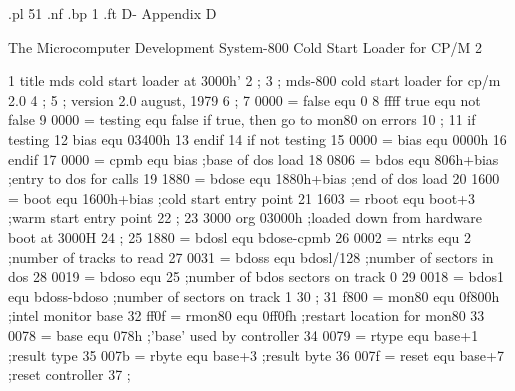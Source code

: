 .pl 51
.nf
.bp 1
.ft                                                       D-%
                                             Appendix D

                              The Microcomputer Development System-800 Cold Start Loader for CP/M 2



  1                                title   mds cold start loader at 3000h'
  2                       ;
  3                       ;        mds-800 cold start loader for cp/m 2.0
  4                       ;
  5                       ;        version 2.0 august, 1979
  6                       ;
  7      0000 =           false    equ     0
  8      ffff             true     equ     not false
  9      0000 =           testing  equ     false    if true, then go to mon80 on errors
 10                       ;
 11                                if      testing
 12                       bias     equ     03400h
 13                                endif
 14                                if      not testing
 15      0000 =           bias     equ     0000h
 16                                endif
 17      0000 =           cpmb     equ     bias          ;base of dos load
 18      0806 =           bdos     equ     806h+bias     ;entry to dos for calls
 19      1880 =           bdose    equ     1880h+bias    ;end of dos load
 20      1600 =           boot     equ     1600h+bias    ;cold start entry point
 21      1603 =           rboot    equ     boot+3        ;warm start entry point
 22                       ;
 23      3000                      org     03000h        ;loaded down from hardware boot at 3000H
 24                       ;
 25      1880 =           bdosl    equ     bdose-cpmb
 26      0002 =           ntrks    equ     2             ;number of tracks to read
 27      0031 =           bdoss    equ     bdosl/128     ;number of sectors in dos
 28      0019 =           bdoso    equ     25            ;number of bdos sectors on track 0
 29      0018 =           bdos1    equ     bdoss-bdoso   ;number of sectors on track 1
 30                       ;
 31      f800 =           mon80    equ     0f800h        ;intel monitor base
 32      ff0f =           rmon80   equ     0ff0fh        ;restart location for mon80
 33      0078 =           base     equ     078h          ;'base' used by controller
 34      0079 =           rtype    equ     base+1        ;result type
 35      007b =           rbyte    equ     base+3        ;result byte
 36      007f =           reset    equ     base+7        ;reset controller
 37                       ;
